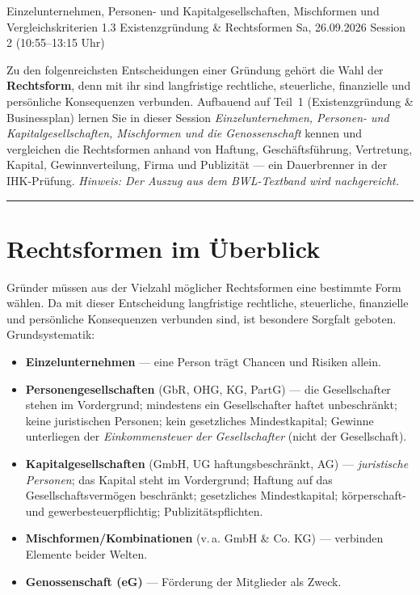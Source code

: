 \documentclass[11pt, a4paper]{article}
\begin{document}
%
  {Einzelunternehmen, Personen- und Kapitalgesellschaften, Mischformen und Vergleichskriterien}%
  {1.3 Existenzgründung \& Rechtsformen}%
  {Sa, 26.09.2026 \textperiodcentered{} Session 2 (10:55--13:15 Uhr)}

\begin{merksatz}[title={\bfseries Worum geht es in Teil 2?}]
Zu den folgenreichsten Entscheidungen einer Gründung gehört die Wahl der
\textbf{Rechtsform}, denn mit ihr sind langfristige rechtliche, steuerliche, finanzielle
und persönliche Konsequenzen verbunden. Aufbauend auf Teil~1 (Existenzgründung \&
Businessplan) lernen Sie in dieser Session \emph{Einzelunternehmen, Personen- und
Kapitalgesellschaften, Mischformen und die Genossenschaft} kennen und vergleichen die
Rechtsformen anhand von Haftung, Geschäftsführung, Vertretung, Kapital,
Gewinnverteilung, Firma und Publizität --- ein Dauerbrenner in der IHK-Prüfung.
\emph{Hinweis: Der Auszug aus dem BWL-Textband wird nachgereicht.}
\end{merksatz}

\tableofcontents
\vspace{1em}
\hrule
\vspace{1em}

\section{Rechtsformen im Überblick}

Gründer müssen aus der Vielzahl möglicher Rechtsformen eine bestimmte Form wählen. Da mit
dieser Entscheidung langfristige rechtliche, steuerliche, finanzielle und persönliche
Konsequenzen verbunden sind, ist besondere Sorgfalt geboten. Grundsystematik:

\begin{itemize}
  \item \textbf{Einzelunternehmen} --- eine Person trägt Chancen und Risiken allein.
  \item \textbf{Personengesellschaften} (GbR, OHG, KG, PartG) --- die Gesellschafter
    stehen im Vordergrund; mindestens ein Gesellschafter haftet unbeschränkt; keine
    juristischen Personen; kein gesetzliches Mindestkapital; Gewinne unterliegen der
    \emph{Einkommensteuer der Gesellschafter} (nicht der Gesellschaft).
  \item \textbf{Kapitalgesellschaften} (GmbH, UG haftungsbeschränkt, AG) ---
    \emph{juristische Personen}; das Kapital steht im Vordergrund; Haftung auf das
    Gesellschaftsvermögen beschränkt; gesetzliches Mindestkapital; körperschaft- und
    gewerbesteuerpflichtig; Publizitätspflichten.
  \item \textbf{Mischformen/Kombinationen} (v.\,a. GmbH \& Co. KG) --- verbinden Elemente
    beider Welten.
  \item \textbf{Genossenschaft (eG)} --- Förderung der Mitglieder als Zweck.
\end{itemize}
\end{document}
